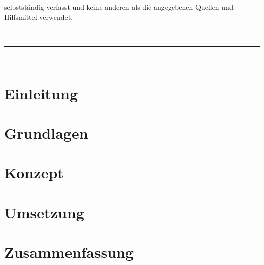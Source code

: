 \documentclass[fontsize=12pt,DIV=11,BCOR=4mm,fleqn]{scrartcl}
\begin{document}
	selbstständig verfasst und keine anderen als die angegebenen Quellen und Hilfsmittel verwendet.

	\vspace{2cm}
	 \\
	\rule{5cm}{0.4pt} \\
	
	\pagebreak{}
	\clearpage
	\vspace*{0.1cm}
	\tableofcontents{} \thispagestyle{empty} 
	
	\pagebreak{}
	\clearpage
	\clearscrheadings
	\cfoot{\pagemark}
	\setcounter{page}{4} 
	\vspace*{2.5cm}
	\listoffigures{}
	
	\pagebreak{}
	\vspace*{2.5cm}
	\listoftables{}
	
	\pagebreak{}
	\clearscrheadings
	\cfoot{\pagemark}
	\setcounter{page}{1} 
	
	\section{Einleitung}
		
		\pagebreak{}
	\section{Grundlagen}
		
		\pagebreak{}
	\section{Konzept}
		
		\pagebreak{}
	\section{Umsetzung}
		
		\pagebreak{}
	\section{Zusammenfassung}
		
		
\end{document}
